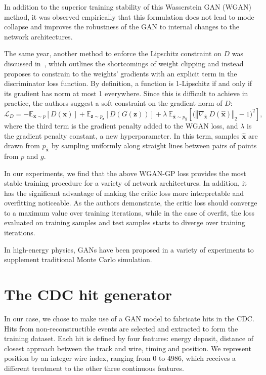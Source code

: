 In addition to the superior training stability of this Wasserstein GAN (WGAN) method, it was observed empirically that this formulation does not lead to mode collapse and improves the robustness of the GAN to internal changes to the network architectures.

The same year, another method to enforce the Lipschitz constraint on $D$ was discussed in~\cite{NIPS2017_892c3b1c}, which outlines the shortcomings of weight clipping and instead proposes to constrain to the weights' gradients with an explicit term in the discriminator loss function. 
By definition, a function is 1-Lipschitz if and only if its gradient has norm at most 1 everywhere. Since this is difficult to achieve in practice, the authors suggest a soft constraint on the gradient norm of $D$:
\begin{equation}\label{eq:WGAN-GP}
    \mathcal{L}_D = 
        -\mathbb{E}_{\mathbf{x} \sim p} \left[ D(\mathbf{x}) \right] +
        \mathbb{E}_{\mathbf{z} \sim p_\mathbf{z}} \left[ D(G(\mathbf{z})) \right] +
        \lambda\ \mathbb{E}_{\hat{\mathbf{x}} \sim p_{\hat{\mathbf{x}}}}
            \left[ \big( \left\Vert \nabla_{\hat{\mathbf{x}}}\ D(\hat{\mathbf{x}}) \right\Vert_2 - 1 \big) ^2 \right],
\end{equation}
where the third term is the gradient penalty added to the WGAN loss, and $\lambda$ is the gradient penalty constant, a new hyperparameter. In this term, samples $\hat{\mathbf{x}}$ are drawn from $p_{\hat{\mathbf{x}}}$ by sampling uniformly along straight lines between pairs of points from $p$ and $g$. 

In our experiments, we find that the above WGAN-GP loss provides the most stable training procedure for a variety of network architectures. In addition, it has the significant advantage of making the critic loss more interpretable and overfitting noticeable. As the authors demonstrate, the critic loss should converge to a maximum value over training iterations, while in the case of overfit, the loss evaluated on training samples and test samples starts to diverge over training iterations.

In high-energy physics, GANs have been proposed in a variety of experiments to supplement traditional Monte Carlo simulation. 

\section{The CDC hit generator}
In our case, we chose to make use of a GAN model to fabricate hits in the CDC.
Hits from non-reconstructible events are selected and extracted to form the training dataset. Each hit is defined by four features: energy deposit, distance of closest approach between the track and wire, timing and position. We represent position by an integer wire index, ranging from 0 to 4986, which receives a different treatment to the other three continuous features.

